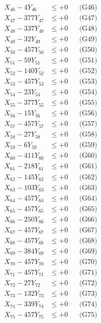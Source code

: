 \documentclass[a4paper,10pt]{article}
\begin{document}
{\begin{align}
X_{46} - 4Y_{46} &\leq +0 && \text{(G46)} \\
X_{47} - 377Y_{47} &\leq +0 && \text{(G47)} \\
X_{48} - 337Y_{48} &\leq +0 && \text{(G48)} \\
X_{49} - 32Y_{49} &\leq +0 && \text{(G49)} \\
X_{50} - 457Y_{50} &\leq +0 && \text{(G50)} \\
\allowbreak
X_{51} - 59Y_{51} &\leq +0 && \text{(G51)} \\
X_{52} - 140Y_{52} &\leq +0 && \text{(G52)} \\
X_{53} - 457Y_{53} &\leq +0 && \text{(G53)} \\
X_{54} - 23Y_{54} &\leq +0 && \text{(G54)} \\
X_{55} - 377Y_{55} &\leq +0 && \text{(G55)} \\
X_{56} - 15Y_{56} &\leq +0 && \text{(G56)} \\
X_{57} - 457Y_{57} &\leq +0 && \text{(G57)} \\
X_{58} - 27Y_{58} &\leq +0 && \text{(G58)} \\
X_{59} - 6Y_{59} &\leq +0 && \text{(G59)} \\
X_{60} - 411Y_{60} &\leq +0 && \text{(G60)} \\
\allowbreak
X_{61} - 218Y_{61} &\leq +0 && \text{(G61)} \\
X_{62} - 145Y_{62} &\leq +0 && \text{(G62)} \\
X_{63} - 103Y_{63} &\leq +0 && \text{(G63)} \\
X_{64} - 457Y_{64} &\leq +0 && \text{(G64)} \\
X_{65} - 457Y_{65} &\leq +0 && \text{(G65)} \\
X_{66} - 250Y_{66} &\leq +0 && \text{(G66)} \\
X_{67} - 457Y_{67} &\leq +0 && \text{(G67)} \\
X_{68} - 457Y_{68} &\leq +0 && \text{(G68)} \\
X_{69} - 384Y_{69} &\leq +0 && \text{(G69)} \\
X_{70} - 457Y_{70} &\leq +0 && \text{(G70)} \\
\allowbreak
X_{71} - 457Y_{71} &\leq +0 && \text{(G71)} \\
X_{72} - 27Y_{72} &\leq +0 && \text{(G72)} \\
X_{73} - 132Y_{73} &\leq +0 && \text{(G73)} \\
X_{74} - 339Y_{74} &\leq +0 && \text{(G74)} \\
X_{75} - 457Y_{75} &\leq +0 && \text{(G75)} \\

\end{align}}
\end{document}
